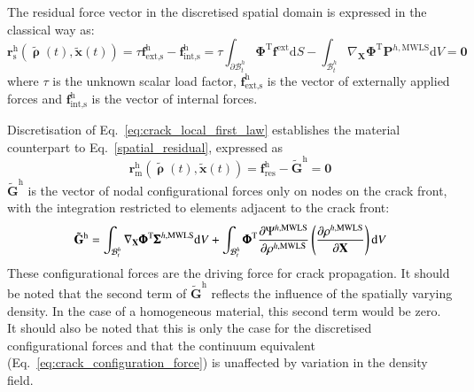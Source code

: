 \documentclass[review]{elsarticle}
\numberwithin{equation}{section}
\begin{document}
The residual force vector in the discretised spatial domain is expressed in the classical way as:
\begin{equation}
\label{spatial_residual}
	\mathbf{r}_\textrm{s}^\textrm{h}(\tilde{\pmb\uprho}(t), \tilde{\mathbf{x}}(t)) = \tau\mathbf{f}^\textrm{h}_\textrm{ext,s}-\mathbf{f}^\textrm{h}_\textrm{int,s}=\tau \int_{\partial\mathcal{B}^h_t} \pmb{\Phi}^\textrm{T}
	\mathbf{f}^\textrm{ext}
	\textrm{d}S-
	\int_{\mathcal{B}^h_t} \nabla_\mathbf{X} \pmb{\Phi}^\textrm{T}
	\mathbf{P}^{h,\textrm{MWLS}}\textrm{d}V=\mathbf{0}
\end{equation}
where $\tau$ is the unknown scalar load factor, $\mathbf{f}^\textrm{h}_\textrm{ext,s}$ is the vector of externally applied forces and $\mathbf{f}^\textrm{h}_\textrm{int,s}$ is the vector of internal forces. 

Discretisation of Eq.~\ref{eq:crack_local_first_law} establishes the material counterpart to Eq.~\ref{spatial_residual}, expressed as
\begin{equation}
\label{material_residual}
\mathbf{r}_\textrm{m}^\textrm{h}(\tilde{\pmb\uprho}(t), \tilde{\mathbf{x}}(t)) = \mathbf{f}^\textrm{h}_\textrm{res}-\tilde{\mathbf{G}}^\textrm{h}=\mathbf{0}
\end{equation}
$\tilde{\mathbf{G}}^\textrm{h}$ is the vector of nodal configurational forces only on nodes on the crack front, with the integration restricted to elements adjacent to the crack front:
\begin{equation}
	\tilde{\mathbf{G}}^\textrm{h} = 
	\int_{\mathcal{B}^h_t}
		\nabla_\mathbf{X}\pmb{\Phi}^\textrm{T} {\pmb\Sigma}^{h,\textrm{MWLS}}
	\textrm{d}V
	+
	\int_{\mathcal{B}^h_t}
		\pmb{\Phi}^\textrm{T} \dfrac{\partial {\Psi}^{h,\textrm{MWLS}} }{\partial \rho^{h,\rm{MWLS}}}
		\left(
			\frac{\partial 
			\rho^{h,\textrm{MWLS}}}{\partial \mathbf{X}}
		\right)
	\textrm{d}V
	\label{eq:mat_int_front}
\end{equation}
These configurational forces are the driving force for crack propagation. It should be noted that the second term of $\tilde{\mathbf{G}}^\textrm{h}$ reflects the influence of the spatially varying density. In the case of a homogeneous material, this second term would be zero. It should also be noted that this is only the case for the discretised configurational forces and that the continuum equivalent (Eq.~\ref{eq:crack_configuration_force}) is unaffected by variation in the density field.
\end{document}
